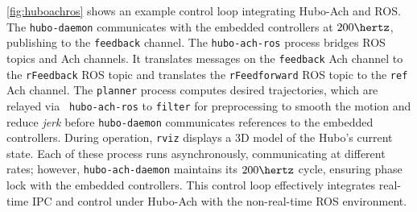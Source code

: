 \autoref{fig:huboachros} shows an example control loop integrating
Hubo-Ach and ROS.  The {\tt hubo-daemon} communicates with the
embedded controllers at $200 \hertz$, publishing to the {\tt feedback}
channel.  The {\tt hubo-ach-ros} process bridges ROS topics and Ach
channels.  It translates messages on the {\tt feedback} Ach channel to
the {\tt rFeedback} ROS topic and translates the {\tt rFeedforward}
ROS topic to the {\tt ref} Ach channel.  The {\tt planner} process
computes desired trajectories, which are relayed via {\tt
  hubo-ach-ros} to {\tt filter} for preprocessing to smooth the motion
and reduce \emph{jerk} before {\tt hubo-daemon} communicates
references to the embedded controllers.  During operation, {\tt rviz}
displays a 3D model of the Hubo's current state.  Each of these
process runs asynchronously, communicating at different rates;
however, {\tt hubo-ach-daemon} maintains its $200 \hertz$ cycle,
ensuring phase lock with the embedded controllers.  This control loop
effectively integrates real-time IPC and control under Hubo-Ach with
the non-real-time ROS environment.


